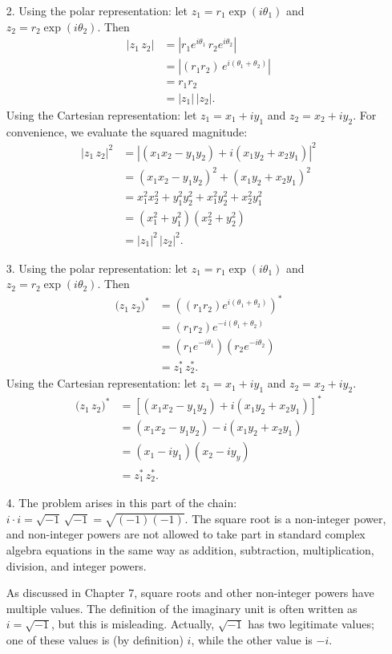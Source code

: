 \documentclass[10pt,a4paper]{article}
\begin{document}
\begin{enumerate}
\item[2.]
Using the polar representation: let $z_1 = r_1 \exp(i\theta_1)$ and
$z_2 = r_2 \exp(i\theta_2)$. Then
\begin{align}
  \big|z_1\, z_2\big| &= \left|r_1 e^{i\theta_1} \, r_2 e^{i\theta_2}\right| \\
  &= \left|(r_1r_2)\,e^{i(\theta_1+\theta_2)}\right| \\
  &= r_1 r_2 \\
  &= |z_1|\, |z_2|.
\end{align}
Using the Cartesian representation: let $z_1 = x_1+iy_1$ and $z_2 =
x_2+iy_2$. For convenience, we evaluate the squared magnitude:
\begin{align}
  \big|z_1\, z_2\big|^2 &= \left|(x_1x_2 - y_1y_2) + i (x_1y_2+x_2y_1)\right|^2 \\
  &= (x_1x_2 - y_1y_2)^2 + (x_1y_2+x_2y_1)^2 \\
  &= x_1^2x_2^2 + y_1^2 y_2^2 + x_1^2y_2^2 + x_2^2 y_1^2 \\
  &= \left(x_1^2 + y_1^2\right)\left(x_2^2 + y_2^2\right) \\
  &= |z_1|^2 \, |z_2|^2.
\end{align}

\item[3.] Using the polar representation: let $z_1 = r_1
  \exp(i\theta_1)$ and $z_2 = r_2 \exp(i\theta_2)$. Then
\begin{align}\big(z_1\, z_2\big)^* &= \left(\left(r_1r_2\right) e^{i(\theta_1+\theta_2)}\right)^* \\ &= \left(r_1r_2\right) e^{-i(\theta_1+\theta_2)} \\
  &= \left(r_1 e^{-i\theta_1}\right) \left(r_2 e^{-i\theta_2}\right) \\
  &= z_1^* \, z_2^*.
\end{align}
Using the Cartesian representation: let $z_1 = x_1+iy_1$ and
$z_2 = x_2+iy_2$.
\begin{align}\big(z_1\, z_2\big)^* &= \left[\left(x_1x_2 - y_1y_2\right) + i \left(x_1y_2+x_2y_1\right)\right]^* \\
  &= \left(x_1x_2 - y_1y_2\right) - i \left(x_1y_2+x_2y_1\right) \\
  &= \left(x_1 - iy_1\right) \left(x_2 - iy_y\right) \\
  &= z_1^* \, z_2^*.
\end{align}

\item[4.]
The problem arises in this part of the chain: $i\cdot i =
\sqrt{-1}\,\sqrt{-1} = \sqrt{(-1)(-1)}$. The square root is a
non-integer power, and non-integer powers are not allowed to take part
in standard complex algebra equations in the same way as addition,
subtraction, multiplication, division, and integer powers.

As discussed in Chapter 7, square roots and other non-integer powers
have multiple values. The definition of the imaginary unit is often
written as $i = \sqrt{-1}$, but this is misleading. Actually,
$\sqrt{-1}$ has two legitimate values; one of these values is (by
definition) $i$, while the other value is $-i$.
\end{enumerate}
\end{document}
